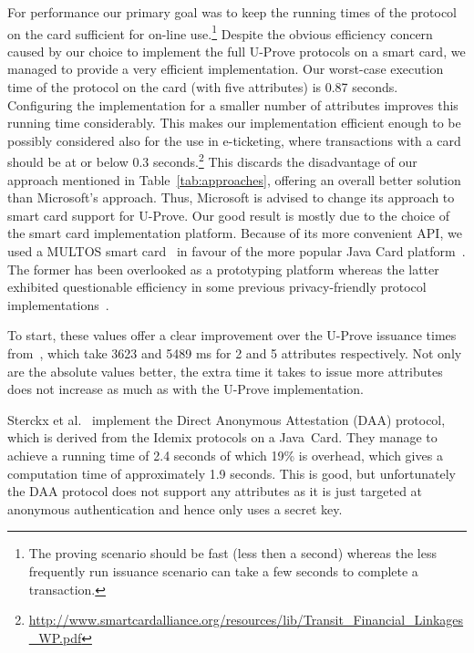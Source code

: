 For performance our primary goal was to keep the running times of the
protocol on the card sufficient for on-line use.\footnote{The proving
scenario should be fast (less then a second) whereas the less frequently
run issuance scenario can take a few seconds to complete a transaction.}
Despite the obvious
efficiency concern caused by our choice to implement the full U-Prove
protocols on a smart card, we managed to provide a very efficient
implementation. Our worst-case execution time of the protocol on the card
(with five attributes) is 0.87 seconds. Configuring the implementation for
a smaller number of attributes improves this running time considerably.
This makes our implementation efficient enough to be possibly considered
also for the use in e-ticketing, where transactions with a card should be
at or below 0.3 seconds.\footnote{
\url{http://www.smartcardalliance.org/resources/lib/Transit_Financial_Linkages_WP.pdf}}
This discards the disadvantage of our approach mentioned in
Table~\ref{tab:approaches}, offering an overall better solution than
Microsoft's approach. Thus, Microsoft is advised to change its approach to
smart card support for U-Prove. Our good result is mostly due to the choice of the
smart card implementation platform. Because of its more convenient API, we
used a MULTOS smart card~\cite{MULTOS2005} in favour of the more popular
Java Card platform~\cite{Chen00}. The former has been overlooked as a
prototyping platform whereas the latter exhibited questionable efficiency
in some previous privacy-friendly protocol
implementations~\cite{BichselCGS2009,Sterckx09,TewsJacobs09}.


To start, these values offer a clear improvement over the U-Prove issuance times
from~\cite{MostowskiVullers11}, which take 3623 and 5489 ms for 2 and 5
attributes respectively. Not only are the absolute values better, the extra time
it takes to issue more attributes does not increase as much as with the U-Prove
implementation.

Sterckx et al.~\cite{Sterckx09} implement the Direct Anonymous Attestation (DAA)
protocol, which is derived from the Idemix protocols on a Java~Card. They
manage to achieve a running time of 2.4 seconds of which 19\% is overhead, which
gives a computation time of approximately 1.9 seconds. This is good, but
unfortunately the DAA protocol does not support any attributes as it is just
targeted at anonymous authentication and hence only uses a secret key.

